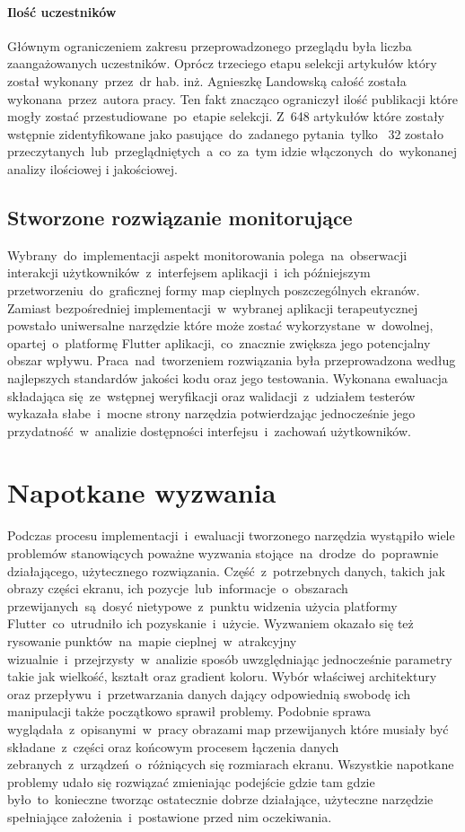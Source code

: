 \paragraph{Ilość uczestników}
Głównym ograniczeniem zakresu przeprowadzonego przeglądu była liczba zaangażowanych uczestników. Oprócz trzeciego etapu selekcji artykułów który został wykonany~przez~dr hab. inż. Agnieszkę Landowską całość została wykonana~przez~autora pracy. Ten fakt znacząco ograniczył ilość publikacji które mogły zostać przestudiowane~po~etapie selekcji. Z~648 artykułów które zostały wstępnie zidentyfikowane jako pasujące~do~zadanego pytania~tylko~ 32 zostało przeczytanych~lub~przeglądniętych~a~co~za~tym idzie włączonych~do~wykonanej analizy ilościowej i jakościowej.

\subsection{Stworzone rozwiązanie monitorujące}
Wybrany~do~implementacji aspekt monitorowania polega~na~obserwacji interakcji użytkowników~z~interfejsem aplikacji~i~ich późniejszym przetworzeniu~do~graficznej formy map cieplnych poszczególnych ekranów. Zamiast bezpośredniej implementacji~w~wybranej aplikacji terapeutycznej powstało uniwersalne narzędzie które może zostać wykorzystane~w~dowolnej, opartej~o~platformę Flutter aplikacji,~co~znacznie zwiększa jego potencjalny obszar wpływu. Praca~nad~tworzeniem rozwiązania była przeprowadzona według najlepszych standardów jakości kodu oraz jego testowania. Wykonana ewaluacja składająca się~ze~wstępnej weryfikacji oraz walidacji~z~udziałem testerów wykazała słabe~i~mocne strony narzędzia potwierdzając jednocześnie jego przydatność~w~analizie dostępności interfejsu~i~zachowań użytkowników. 
	
\section{Napotkane wyzwania}
Podczas procesu implementacji~i~ewaluacji tworzonego narzędzia wystąpiło wiele problemów stanowiących poważne wyzwania stojące~na~drodze~do~poprawnie działającego, użytecznego rozwiązania. Część~z~potrzebnych danych, takich jak obrazy części ekranu, ich pozycje~lub~informacje~o~obszarach przewijanych~są~dosyć nietypowe~z~punktu widzenia użycia platformy Flutter~co~utrudniło ich pozyskanie~i~użycie. Wyzwaniem okazało się też rysowanie punktów~na~mapie cieplnej~w~atrakcyjny wizualnie~i~przejrzysty~w~analizie sposób uwzględniając jednocześnie parametry takie jak wielkość, kształt oraz gradient koloru. Wybór właściwej architektury oraz przepływu~i~przetwarzania danych dający odpowiednią swobodę ich manipulacji także początkowo sprawił problemy. Podobnie sprawa wyglądała~z~opisanymi~w~pracy obrazami map przewijanych które musiały być składane~z~części oraz końcowym procesem łączenia danych zebranych~z~urządzeń~o~różniących się rozmiarach ekranu. Wszystkie napotkane problemy udało się rozwiązać zmieniając podejście gdzie tam gdzie było~to~konieczne tworząc ostatecznie dobrze działające, użyteczne narzędzie spełniające założenia~i~postawione przed nim oczekiwania.
